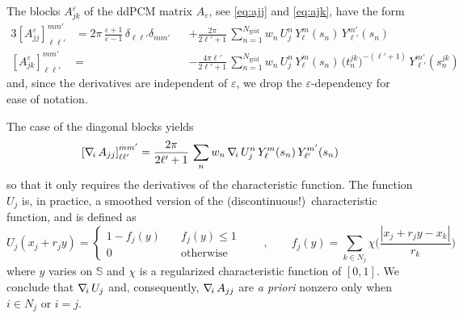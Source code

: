 The blocks $A_{jk}^\varepsilon$ of the ddPCM matrix $A_\varepsilon$, see \eqref{eq:ajj} and \eqref{eq:ajk}, have the form
\begin{alignat*}{3}
{[A_{jj}^\varepsilon]}_{\ell \ell'}^{mm'}& = 2\pi \, \frac{\varepsilon + 1}{\varepsilon - 1}\, \delta_{\ell \ell'} \delta_{m m'}&& + \frac{2\pi}{2 \ell' + 1} \,\sum_{n= 1}^{N_\text{grid}} w_n \, U_j^n  \,Y_\ell^m(s_n) \,  Y_{\ell'}^{m'}(s_n) \\
{[A_{jk}^\varepsilon]}_{\ell \ell'}^{mm'}& =&& -  \frac{4 \pi \ell'}{2 \ell'+1} \, \sum_{n= 1}^{N_\text{grid}} w_n\, U_j^n  \, Y_\ell^m(s_n) \, \big( t_n^{jk}\big)^{-(\ell'+1)} \, Y_{\ell'}^{m'} (s_n^{jk})
\end{alignat*}
and, since the derivatives are independent of $\varepsilon$, we drop the $\varepsilon$-dependency for ease of notation.

The case of the diagonal blocks yields
\[
{[\nabla_{\!i}\, A_{jj}]}_{\ell \ell'}^{mm'} = \frac{2\pi}{2 \ell' + 1} \,\sum_{n} w_n \, \nabla_{\!i}\, U_j^n  \,Y_\ell^m(s_n) \,  Y_{\ell'}^{m'}(s_n)
\]
so that it only requires the derivatives of the characteristic function. The function $U_j$ is, in practice, a smoothed version of the (discontinuous!)~characteristic function, and is defined as 
\[
U_j(x_j + r_j y) =
\begin{cases}
1 - f_j(y) 	&\quad f_j(y) \le 1\\
0		&\quad \text{otherwise}
\end{cases}
\qquad , \qquad 
f_j(y) = \sum_{k \in N_j} \chi \bigg(\frac{|x_j + r_j y - x_k|}{r_k}\bigg)
\]
where $y$ varies on $\mathbb{S}$ and $\chi$ is a regularized characteristic function of $[0,1]$. We conclude that $\nabla_{\!i}\, U_j$ and, consequently, $\nabla_{\!i}\, A_{jj}$ are \emph{a priori} nonzero only when $i \in N_j$ or $i = j$.

